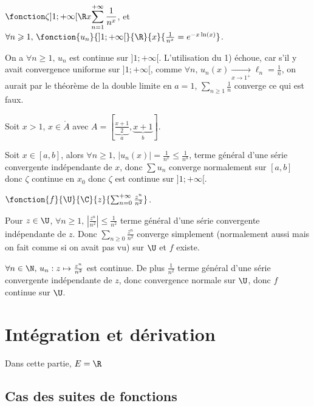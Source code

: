 \begin{exemple}
    $\displaystyle \fonction \zeta{]1; +\infty[}{\R}{x}{\sum_{n = 1}^{+ \infty} \frac 1 {n^x}}$, et 
    $\forall n \geqslant 1, \, \fonction{u_n}{]1; +\infty[}{\R}{x}{\frac 1 {n^x} = e^{-x \ln(x)}}$. 

    On a $\forall n \geqslant 1, \, u_n$ est continue sur $]1; +\infty[$. L'utilisation du 1) échoue, car 
    s'il y avait convergence uniforme sur $]1; +\infty[$, comme $\forall n, \, u_n(x) \xrightarrow[x \to 1^+]{} \ell_n = \frac 1 n$,
    on aurait par le théorème de la double limite en $a = 1$, $\sum_{n \geqslant 1 } \frac 1 n $ converge ce qui est faux. 

    \svspace Soit $x > 1$, $x \in \mathring A$ avec $A = \left[ \underbrace{\frac{x + 1}{2}}_{ a }, \underbrace{x + 1}_{ b} \right]$.

    Soit $x \in [a, b]$, alors $\forall n \geqslant 1, \, \left| u_n(x) \right| = \frac 1 {n^x} \leqslant \frac 1 {n^a}$, terme 
    général d'une série convergente indépendante de $x$, donc $\sum u_n$ converge normalement sur $[a, b]$ 
    donc $\zeta$ continue en $x_0$ donc $\zeta$ est continue sur $]1; +\infty[$.
\end{exemple}


\begin{exemple}
    $\fonction{f}{\U}{\C}{z}{\sum_{n = 0}^{+ \infty} \frac{z^n }{n^2}}$. 

    Pour $z \in \U$, $\forall n \geqslant 1, \, \left| \frac{z^n }{n^2} \right| \leqslant \frac 1 {n^2}$ terme général
    d'une série convergente indépendante de $z$. Donc $\sum_{n \geqslant 0} \frac{z^n }{n^2}$ converge simplement (normalement aussi mais on fait comme si 
    on avait pas vu) sur $\U$ et $f$ existe. 

    $\forall n \in \N, \, u_n : z \mapsto \frac{z^n }{n^2}$ est continue. De plus 
    $\frac 1 {n^2}$ terme général d'une série convergente indépendante de $z$, donc convergence 
    normale sur $\U$, donc $f$ continue sur $\U$.
\end{exemple}

\section{Intégration et dérivation}
Dans cette partie, $E = \R$
\subsection{Cas des suites de fonctions}

